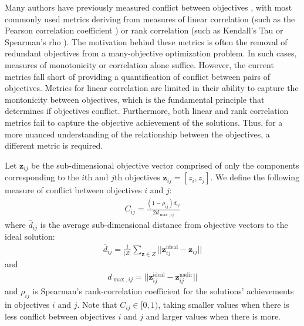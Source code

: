 Many authors have previously measured conflict between objectives \cite{brockhoff2009objective}\cite{purshouse2003conflict}\cite{gal1977redundant}, with most commonly used metrics deriving from measures of linear correlation (such as the Pearson correlation coefficient \cite{deb2006searching}) or rank correlation (such as Kendall's Tau \cite{kanoulas2009empirical} or Spearman's rho \cite{karande2012application}). The motivation behind these metrics is often the removal of redundant objectives from a many-objective optimization problem. In such cases, measures of monotonicity or correlation alone suffice. However, the current metrics fall short of providing a quantification of conflict between pairs of objectives. Metrics for linear correlation are limited in their ability to capture the montonicity between objectives, which is the fundamental principle that determines if objectives conflict. Furthermore, both linear and rank correlation metrics fail to capture the objective achievement of the solutions. Thus, for a more nuanced understanding of the relationship between the objectives, a different metric is required.

Let $\mathbf{z}_{ij}$ be the sub-dimensional objective vector comprised of only the components corresponding to the $i$th and $j$th objectives $\mathbf{z}_{ij} = [z_i,z_j]$. We define the following measure of conflict between objectives $i$ and $j$:
\begin{align}
C_{ij} = \frac{(1-\rho_{ij})\overbar{d}_{ij}}{2 d_{\max,ij}} \label{eqn:defConflict}
\end{align}
where $\overbar{d}_{ij}$ is the average sub-dimensional distance from objective vectors to the ideal solution:
\begin{align}
\overbar{d}_{ij} = \frac{1}{|Z|} \sum_{\mathbf{z} \in Z} ||\mathbf{z}^{\text{ideal}}_{ij} - \mathbf{z}_{ij}||
\end{align}
and
\begin{align}
d_{\max,ij} = ||\mathbf{z}^{\text{ideal}}_{ij} - \mathbf{z}^{\text{nadir}}_{ij}||
\end{align}
and $\rho_{ij}$ is Spearman's rank-correlation coefficient for the solutions' achievements in objectives $i$ and $j$. Note that $C_{ij} \in [0,1)$, taking smaller values when there is less conflict between objectives $i$ and $j$ and larger values when there is more.

